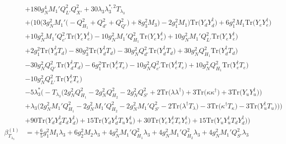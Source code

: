 {\begin{align}
 &+180 g_{N}^{4} M_1' Q_{L'}^{2} Q_{X'}^{2} +30 \lambda_3 \lambda_{3}^{*,2} T_{\lambda_3} \nonumber \\ 
 &+\Big(10 \Big(3 g_{N}^{2} M_1' \Big(- Q_{H_1}^{2}  + Q_{d'}^{2} + Q_{Q'}^{2}\Big) + 8 g_{3}^{2} M_3 \Big) -2 g_{1}^{2} M_1 \Big)\mbox{Tr}\Big({Y_d  Y_{d}^{\dagger}}\Big) +6 g_{1}^{2} M_1 \mbox{Tr}\Big({Y_e  Y_{e}^{\dagger}}\Big) \nonumber \\ 
 &+10 g_{N}^{2} M_1' Q_{e'}^{2} \mbox{Tr}\Big({Y_e  Y_{e}^{\dagger}}\Big) -10 g_{N}^{2} M_1' Q_{H_1}^{2} \mbox{Tr}\Big({Y_e  Y_{e}^{\dagger}}\Big) +10 g_{N}^{2} M_1' Q_{L'}^{2} \mbox{Tr}\Big({Y_e  Y_{e}^{\dagger}}\Big) \nonumber \\ 
 &+2 g_{1}^{2} \mbox{Tr}\Big({Y_{d}^{\dagger}  T_d}\Big) -80 g_{3}^{2} \mbox{Tr}\Big({Y_{d}^{\dagger}  T_d}\Big) -30 g_{N}^{2} Q_{d'}^{2} \mbox{Tr}\Big({Y_{d}^{\dagger}  T_d}\Big) +30 g_{N}^{2} Q_{H_1}^{2} \mbox{Tr}\Big({Y_{d}^{\dagger}  T_d}\Big) \nonumber \\ 
 &-30 g_{N}^{2} Q_{Q'}^{2} \mbox{Tr}\Big({Y_{d}^{\dagger}  T_d}\Big) -6 g_{1}^{2} \mbox{Tr}\Big({Y_{e}^{\dagger}  T_e}\Big) -10 g_{N}^{2} Q_{e'}^{2} \mbox{Tr}\Big({Y_{e}^{\dagger}  T_e}\Big) +10 g_{N}^{2} Q_{H_1}^{2} \mbox{Tr}\Big({Y_{e}^{\dagger}  T_e}\Big) \nonumber \\ 
 &-10 g_{N}^{2} Q_{L'}^{2} \mbox{Tr}\Big({Y_{e}^{\dagger}  T_e}\Big) \nonumber \\ 
 &-5 \lambda_3^* \Big(- T_{\lambda_3} \Big(2 g_{N}^{2} Q_{H_1}^{2}  -2 g_{N}^{2} Q_{H_2}^{2}  -2 g_{N}^{2} Q_{S'}^{2}  + 2 \mbox{Tr}\Big({\lambda  \lambda^{\dagger}}\Big)  + 3 \mbox{Tr}\Big({\kappa  \kappa^{\dagger}}\Big)  + 3 \mbox{Tr}\Big({Y_u  Y_{u}^{\dagger}}\Big) \Big)\nonumber \\ 
 &+\lambda_3 \Big(2 g_{N}^{2} M_1' Q_{H_1}^{2}  -2 g_{N}^{2} M_1' Q_{H_2}^{2}  -2 g_{N}^{2} M_1' Q_{S'}^{2}  -2 \mbox{Tr}\Big({\lambda^{\dagger}  T_{\lambda}}\Big)  -3 \mbox{Tr}\Big({\kappa^{\dagger}  T_{\kappa}}\Big)  -3 \mbox{Tr}\Big({Y_{u}^{\dagger}  T_u}\Big) \Big)\Big)\nonumber \\ 
 &+90 \mbox{Tr}\Big({Y_d  Y_{d}^{\dagger}  T_d  Y_{d}^{\dagger}}\Big) +15 \mbox{Tr}\Big({Y_d  Y_{d}^{\dagger}  T_u  Y_{u}^{\dagger}}\Big) +30 \mbox{Tr}\Big({Y_e  Y_{e}^{\dagger}  T_e  Y_{e}^{\dagger}}\Big) +15 \mbox{Tr}\Big({Y_u  Y_{u}^{\dagger}  T_d  Y_{d}^{\dagger}}\Big) \Big)\\ 
\beta_{T_{\lambda_3}}^{(1)} & =  
+\frac{6}{5} g_{1}^{2} M_1 \lambda_3 +6 g_{2}^{2} M_2 \lambda_3 +4 g_{N}^{2} M_1' Q_{H_1}^{2} \lambda_3 +4 g_{N}^{2} M_1' Q_{H_2}^{2} \lambda_3 +4 g_{N}^{2} M_1' Q_{S'}^{2} \lambda_3 \nonumber \\ 

\end{align}}

